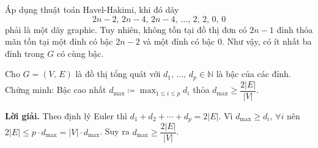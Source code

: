 Áp dụng thuật toán Havel-Hakimi, khi đó dãy $$2n-2,\,2n-4,\,2n-4,\,\ldots,\,2,\,2,\,0,\,0$$ phải là một dãy graphic. Tuy nhiên, không tồn tại đồ thị đơn có $2n-1$ đỉnh thỏa mãn tồn tại một đỉnh có bậc $2n-2$ và một đỉnh có bậc $0$. Như vậy, có ít nhất ba đỉnh trong $G$ có cùng bậc.

\begin{tcolorbox}[breakable]
    \begin{baitoan}\label{pb:w08:01}
        Cho $G = (V,\,E)$ là đồ thị tổng quát với $d_1,\,\ldots,\,d_p\in\mathbb{N}$ là bậc của các đỉnh. Chứng minh: Bậc cao nhất $d_{\max}\coloneqq\max_{1\le i\le p} d_i$ thỏa $d_{\max}\ge\dfrac{2|E|}{|V|}$.
    \end{baitoan}
\end{tcolorbox}

\textbf{Lời giải. }Theo định lý Euler thì $d_1 + d_2 + \cdots + d_p = 2|E|$. Vì $d_{\max} \geq d_i,\,\forall i$ nên $2|E| \leq p\cdot d_{\max} = |V| \cdot d_{\max}$. Suy ra $d_{\max} \geq \dfrac{2|E|}{|V|}$.







